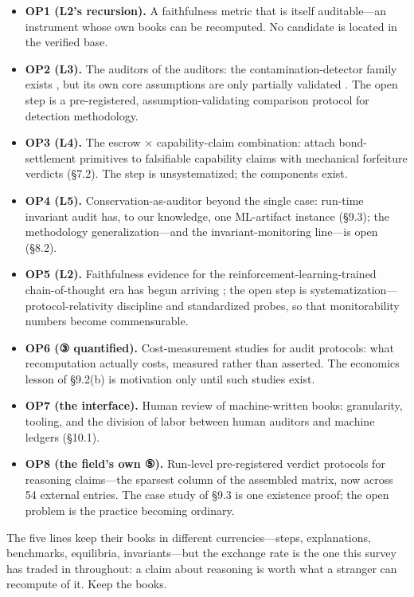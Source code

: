\documentclass[11pt,a4paper]{article}
\begin{document}
\begin{itemize}[leftmargin=1.6em]
\item \textbf{OP1 (L2's recursion).} A faithfulness metric that is itself auditable—an instrument whose own books can be recomputed. No candidate is located in the verified base.
\item \textbf{OP2 (L3).} The auditors of the auditors: the contamination-detector family exists \cite{key32,key33,key34,key35,key36,key37}, but its own core assumptions are only partially validated \cite{key35}. The open step is a pre-registered, assumption-validating comparison protocol for detection methodology.
\item \textbf{OP3 (L4).} The escrow × capability-claim combination: attach bond-settlement primitives \cite{key42,key43,key44,key45} to falsifiable capability claims with mechanical forfeiture verdicts (§7.2). The step is unsystematized; the components exist.
\item \textbf{OP4 (L5).} Conservation-as-auditor beyond the single case: run-time invariant audit has, to our knowledge, one ML-artifact instance (§9.3); the methodology generalization—and the invariant-monitoring line—is open (§8.2).
\item \textbf{OP5 (L2).} Faithfulness evidence for the reinforcement-learning-trained chain-of-thought era has begun arriving \cite{key26,key27,key28,key30}; the open step is systematization—protocol-relativity discipline and standardized probes, so that monitorability numbers become commensurable.
\item \textbf{OP6 (③ quantified).} Cost-measurement studies for audit protocols: what recomputation actually costs, measured rather than asserted. The economics lesson of §9.2(b) is motivation only until such studies exist.
\item \textbf{OP7 (the interface).} Human review of machine-written books: granularity, tooling, and the division of labor between human auditors and machine ledgers (§10.1).
\item \textbf{OP8 (the field's own ⑤).} Run-level pre-registered verdict protocols for reasoning claims—the sparsest column of the assembled matrix, now across 54 external entries. The case study of §9.3 is one existence proof; the open problem is the practice becoming ordinary.
\end{itemize}

The five lines keep their books in different currencies—steps, explanations, benchmarks, equilibria, invariants—but the exchange rate is the one this survey has traded in throughout: a claim about reasoning is worth what a stranger can recompute of it. Keep the books.
\end{document}
